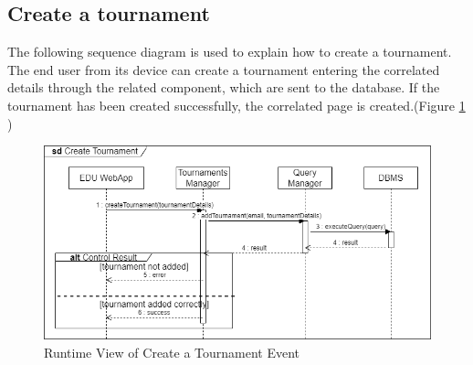 \subsection{Create a tournament}
The following sequence diagram is used to explain how to create a tournament. The end user from its device can create a tournament entering the correlated details through the related component, which are sent to the database. If the tournament has been created successfully, the correlated page is created.(Figure \ref{fig:RuntimeView_CreateTournament} )
\begin{figure}[H]
    \centering
    \includegraphics[width=\textwidth]{images/runtimeviews/RuntimeView_CreateTournament.png}
    \caption{Runtime View of Create a Tournament Event}
    \label{fig:RuntimeView_CreateTournament}
\end{figure}

